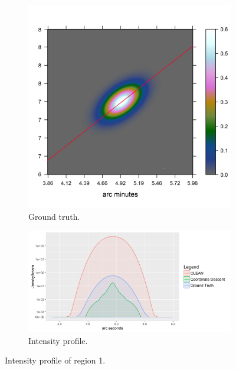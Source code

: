 \begin{figure}[h]
	\centering
	\begin{subfigure}[b]{0.3\linewidth}
		\includegraphics[width=\linewidth, trim={0.4in, 0.9in, 3.2in, 1.8in}, clip]{./chapters/20.results/mixed/mixed_cut_model_line.png}
		\caption{Ground truth.}
		\label{results:mixed:cut0:img}
	\end{subfigure}
	\begin{subfigure}[b]{0.6\linewidth}
		\includegraphics[width=\linewidth, trim={0, 0, 0.2in, 0.2in}, clip]{./chapters/20.results/mixed/mixed_cut0.png}
		\caption{Intensity profile.}
		\label{results:mixed:cut0:profile}
	\end{subfigure}
	\caption{Intensity profile of region 1.}
	\label{results:mixed:cut0:contour}
\end{figure}

